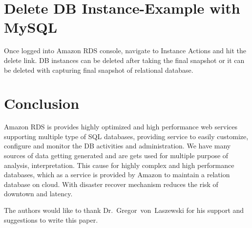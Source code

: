 \section{Delete DB Instance-Example with MySQL}

Once logged into Amazon RDS console, navigate to Instance Actions 
and hit the delete link.
DB instances can be deleted after taking the final snapshot or it can be 
deleted with capturing final snapshot of relational database.

\section{Conclusion}
Amazon RDS is provides highly optimized and high performance web services
supporting multiple type of SQL databases, providing service to easily 
customize, configure and monitor the DB activities and administration.
We have many sources of data getting generated and are gets used for 
multiple purpose of analysis, interpretation. This cause for highly complex
and high performance databases, which as a service is provided by Amazon to 
maintain a relation database on cloud. With disaster recover mechanism reduces
the risk of downtown and latency.

\begin{acks}
  The authors would like to thank Dr.~Gregor~von~Laszewski for his
  support and suggestions to write this paper.
\end{acks}



 
